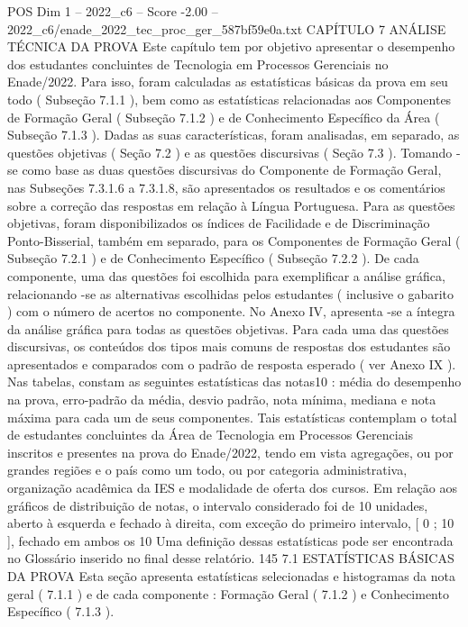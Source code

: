 \begin{textsample}{POS Dim 1 – 2022\_c6 – Score -2.00 – 2022\_c6/enade\_2022\_tec\_proc\_ger\_587bf59e0a.txt}  \label{ex:f1_pos_264}
CAPÍTULO 7 ANÁLISE TÉCNICA DA PROVA Este capítulo tem por objetivo apresentar o desempenho dos estudantes concluintes de Tecnologia em Processos Gerenciais no Enade/2022.
Para isso, foram calculadas as estatísticas básicas da prova em seu todo ( Subseção 7.1.1 ), bem como as estatísticas relacionadas aos Componentes de Formação Geral ( Subseção 7.1.2 ) e de Conhecimento Específico da Área ( Subseção 7.1.3 ).
Dadas as suas características, foram analisadas, em separado, as questões objetivas ( Seção 7.2 ) e as questões discursivas ( Seção 7.3 ).
Tomando -se como base as duas questões discursivas do Componente de Formação Geral, nas Subseções 7.3.1.6 a 7.3.1.8, são apresentados os resultados e os comentários sobre a correção das respostas em relação à Língua Portuguesa.
Para as questões objetivas, foram disponibilizados os índices de Facilidade e de Discriminação Ponto-Bisserial, também em separado, para os Componentes de Formação Geral ( Subseção 7.2.1 ) e de Conhecimento Específico ( Subseção 7.2.2 ).
De cada componente, uma das questões foi escolhida para exemplificar a análise gráfica, relacionando -se as alternativas escolhidas pelos estudantes ( inclusive o gabarito ) com o número de acertos no componente.
No Anexo IV, apresenta -se a íntegra da análise gráfica para todas as questões objetivas.
Para cada uma das questões discursivas, os conteúdos dos tipos mais comuns de respostas dos estudantes são apresentados e comparados com o padrão de resposta esperado ( ver Anexo IX ).
Nas tabelas, constam as seguintes estatísticas das notas10 : média do desempenho na prova, erro-padrão da média, desvio padrão, nota mínima, mediana e nota máxima para cada um de seus componentes.
Tais estatísticas contemplam o total de estudantes concluintes da Área de Tecnologia em Processos Gerenciais inscritos e presentes na prova do Enade/2022, tendo em vista agregações, ou por grandes regiões e o país como um todo, ou por categoria administrativa, organização acadêmica da IES e modalidade de oferta dos cursos.
Em relação aos gráficos de distribuição de notas, o intervalo considerado foi de 10 unidades, aberto à esquerda e fechado à direita, com exceção do primeiro intervalo, [ 0 ; 10 ], fechado em ambos os 10 Uma definição dessas estatísticas pode ser encontrada no Glossário inserido no final desse relatório. 145 7.1 ESTATÍSTICAS BÁSICAS DA PROVA Esta seção apresenta estatísticas selecionadas e histogramas da nota geral ( 7.1.1 ) e de cada componente : Formação Geral ( 7.1.2 ) e Conhecimento Específico ( 7.1.3 ).

\end{textsample}
